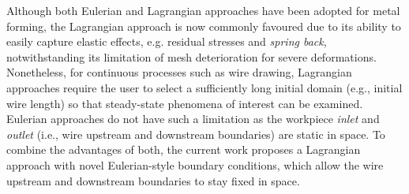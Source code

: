 \documentclass[sn-mathphys,Numbered]{sn-jnl}%
\begin{document}
Although both Eulerian and Lagrangian approaches have been adopted for metal forming, the Lagrangian approach is now commonly favoured due to its ability to easily capture elastic effects, e.g. residual stresses and \emph{spring back}, notwithstanding its limitation of mesh deterioration for severe deformations.
Nonetheless, for continuous processes such as wire drawing, Lagrangian approaches require the user to select a sufficiently long initial domain (e.g., initial wire length) so that steady-state phenomena of interest can be examined.
Eulerian approaches do not have such a limitation as the workpiece \emph{inlet} and \emph{outlet} (i.e., wire upstream and downstream boundaries) are static in space.
To combine the advantages of both, the current work proposes a Lagrangian approach with novel Eulerian-style boundary conditions, which allow the wire upstream and downstream boundaries to stay fixed in space.



\end{document}
